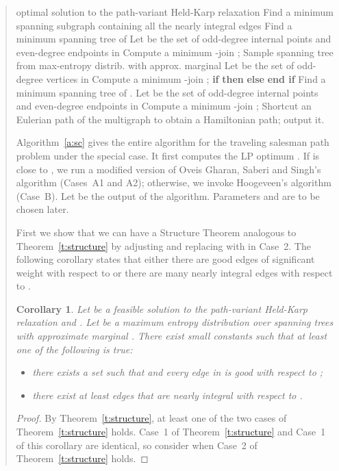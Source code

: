 \documentclass[11pt,letterpaper]{article}
\newtheorem{cor}{Corollary}
\begin{document}
\begin{quote}
\begin{algorithm}[b!]
\begin{algorithmic}[1]
	\STATE optimal solution to the path-variant Held-Karp relaxation
			\STATE Find a minimum spanning subgraph  containing all the nearly integral edges
			\STATE Find a minimum spanning tree  of 
			\STATE Let  be the set of odd-degree internal points and even-degree endpoints in 
			\STATE Compute a minimum -join ; 
		\ELSE[Case A2]
			\STATE 
			\STATE Sample spanning tree  from max-entropy distrib. with approx. marginal \hspace*{-5em}
			\STATE Let  be the set of odd-degree vertices in 
			\STATE Compute a minimum -join ; 
			\STATE \textbf{if}  \textbf{then}  \textbf{else}  \textbf{end if}
		\ENDIF
		\STATE Find a minimum spanning tree  of .
		\STATE Let  be the set of odd-degree internal points and even-degree endpoints in 
		\STATE Compute a minimum -join ; 
	\ENDIF
	\STATE Shortcut an Eulerian path of the multigraph  to obtain a Hamiltonian path; output it.
\end{algorithmic}
\end{algorithm}

Algorithm~\ref{a:sc} gives the entire algorithm for the traveling salesman path problem under the special case. It first computes the LP optimum . If  is close to , we run a modified version of Oveis Gharan, Saberi and Singh's algorithm (Cases~A1 and A2); otherwise, we invoke Hoogeveen's algorithm (Case~B). Let  be the output of the algorithm. Parameters  and  are to be chosen later.

First we show that we can have a Structure Theorem analogous to Theorem~\ref{t:structure} by adjusting  and replacing  with  in Case~2. The following corollary states that either there are good edges of significant weight with respect to  or there are many nearly integral edges with respect to .
\begin{cor}
\label{c:pathstructure}
Let  be a feasible solution to the path-variant Held-Karp relaxation and  . Let  be a maximum entropy distribution over spanning trees with approximate marginal . There exist small constants  such that at least one of the following is true:\begin{itemize}
\item[1.] there exists a set  such that  and every edge in  is good with respect to ;
\item[2.] there exist at least  edges that are nearly integral with respect to .
\end{itemize}
\end{cor}
\begin{proof}
By Theorem~\ref{t:structure}, at least one of the two cases of Theorem~\ref{t:structure} holds. Case~1 of Theorem~\ref{t:structure} and Case~1 of this corollary are identical, so consider when Case~2 of Theorem~\ref{t:structure} holds.


\end{proof}
\end{quote}
\end{document}
